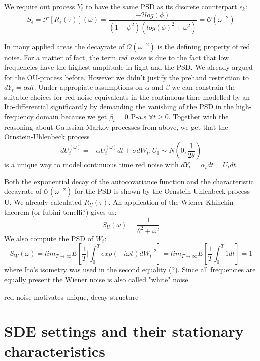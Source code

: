 \documentclass[%
thesis=student,%
coverpage=false,%
titlepage=false,%
headmarks=true, %
german,%
font=libertine, %
math=newpxtx, %
BCOR=5mm,%
coverBCOR=11mm%
]{tumbook}
\begin{document}
We require out process $Y_{t}$ to have the same PSD as its discrete counterpart $\epsilon_{k}$:
\[
S_{\epsilon} = \mathcal{F}[R_{\epsilon}(\tau)](\omega) = \frac{-2log(\phi)}{(1-\phi^{2})(log(\phi)^{2}+\omega^{2})} = \mathcal{O}(\omega^{-2})
\]

In many applied areas the decayrate of $\mathcal{O}(\omega^{-2})$ is the defining property of red noise. For a matter of fact, the term \textit{red noise} is due to the fact that low frequencies have the highest amplitude in light and the PSD. We already argued for the OU-process before. However we didn't justify the prehand restriction to $dY_{t} = \alpha dt$. Under appropiate assumptions on $\alpha$ and $\beta$ we can constrain the suitable choices for red noise equivalents in the continuous time modelled by an Ito-differential significantly by demanding the vanishing of the PSD in the high-frequency domain because we get $\beta_{t} = 0$ P-a.s $\forall t \geq 0$. Together with the reasoning about Gaussian Markov processes from above, we get that the Ornstein-Uhlenbeck process
\[
    dU_{t}^{(\omega)} = -\alpha U_{t}^{(\omega)} dt + \sigma dW_{t}, U_{0} \sim N(0,\frac{1}{2\theta})
\]
is a unique way to model continuous time red noise with $dY_{t} = \alpha_{t}dt = U_{t}dt$. 

Both the exponential decay of the autocovariance function and the characteristic decayrate of $\mathcal{O}(\omega^{-2})$ for the PSD is shown by the Ornstein-Uhlenbeck process U. We already calculated $R_{U}(\tau)$. An application of the Wiener-Khinchin theorem (or fubini tonelli?) gives us: 
\[
    S_{U}(\omega) = \frac{1}{\theta^{2} + \omega^{2}}
\]
We also compute the PSD of $W_{t}$:
\[
S_{W}(\omega) =  lim_{T\rightarrow\infty}E[\frac{1}{T}\lvert\int_{0}^{T}exp(-i\omega t)dW_{t}\rvert^{2}] = lim_{T\rightarrow \infty}E[\frac{1}{T}\int_{0}^{T}1dt] = 1
\]
where Ito's isometry was used in the second equality (?). Since all frequencies are equally present the Wiener noise is also called "white" noise.


red noise motivates unique, decay structure



\chapter{SDE settings and their stationary characteristics}
\end{document}
